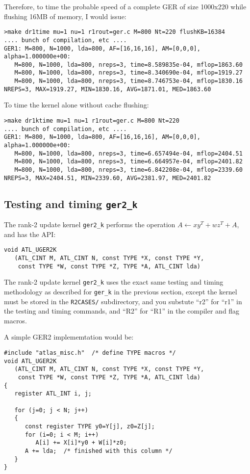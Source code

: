 \documentclass[11pt]{article}
\newcommand{\kernk}[1]{{\tt #1\_k}}
\begin{document}
Therefore, to time the probable speed of a complete GER of size 1000x220
while flushing 16MB of memory, I would issue:
\begin{verbatim}
>make dr1time mu=1 nu=1 r1rout=ger.c M=800 Nt=220 flushKB=16384
.... bunch of compilation, etc ....
GER1: M=800, N=1000, lda=800, AF=[16,16,16], AM=[0,0,0], alpha=1.000000e+00:
   M=800, N=1000, lda=800, nreps=3, time=8.589835e-04, mflop=1863.60
   M=800, N=1000, lda=800, nreps=3, time=8.340690e-04, mflop=1919.27
   M=800, N=1000, lda=800, nreps=3, time=8.746753e-04, mflop=1830.16
NREPS=3, MAX=1919.27, MIN=1830.16, AVG=1871.01, MED=1863.60
\end{verbatim}

To time the kernel alone without cache flushing:
\begin{verbatim}
>make dr1ktime mu=1 nu=1 r1rout=ger.c M=800 Nt=220
.... bunch of compilation, etc ....
GER1: M=800, N=1000, lda=800, AF=[16,16,16], AM=[0,0,0], alpha=1.000000e+00:
   M=800, N=1000, lda=800, nreps=3, time=6.657494e-04, mflop=2404.51
   M=800, N=1000, lda=800, nreps=3, time=6.664957e-04, mflop=2401.82
   M=800, N=1000, lda=800, nreps=3, time=6.842208e-04, mflop=2339.60
NREPS=3, MAX=2404.51, MIN=2339.60, AVG=2381.97, MED=2401.82
\end{verbatim}

\subsection{Testing and timing \kernk{ger2}}
The rank-2 update kernel \kernk{ger2} performs the operation
$A \leftarrow xy^T + wz^T + A$, and has the API:
\begin{verbatim}
void ATL_UGER2K
   (ATL_CINT M, ATL_CINT N, const TYPE *X, const TYPE *Y,
    const TYPE *W, const TYPE *Z, TYPE *A, ATL_CINT lda)
\end{verbatim}
The rank-2 update kernel \kernk{ger2} uses the exact same testing
and timing methodology as described for \kernk{ger} in the previous
section, except the kernel must be stored in the {\tt R2CASES/} subdirectory,
and you substute ``r2'' for ``r1'' in the testing and timing commands,
and ``R2'' for ``R1'' in the compiler and flag macros.

A simple GER2 implememtation would be:
\begin{verbatim}
#include "atlas_misc.h"  /* define TYPE macros */
void ATL_UGER2K
   (ATL_CINT M, ATL_CINT N, const TYPE *X, const TYPE *Y,
    const TYPE *W, const TYPE *Z, TYPE *A, ATL_CINT lda)
{
   register ATL_INT i, j;

   for (j=0; j < N; j++)
   {
      const register TYPE y0=Y[j], z0=Z[j];
      for (i=0; i < M; i++)
         A[i] += X[i]*y0 + W[i]*z0;
      A += lda;  /* finished with this column */
   }
}
\end{verbatim}
\end{document}
